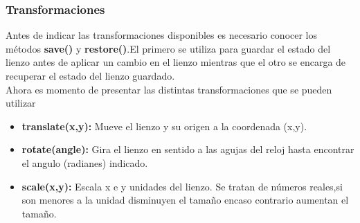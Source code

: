 \subsubsection*{Transformaciones}
Antes de indicar las transformaciones disponibles es necesario conocer los métodos \textbf{save()} y \textbf{restore()}.El primero se utiliza para guardar el estado del lienzo antes de aplicar un cambio en el lienzo mientras que el otro se encarga de recuperar el estado del lienzo guardado.
\\Ahora es momento de presentar las distintas transformaciones que se pueden utilizar
\begin{itemize}
\item \textbf{translate(x,y):} Mueve el lienzo y su origen a la coordenada (x,y).
\item\textbf{ rotate(angle):} Gira el lienzo en sentido a las agujas del reloj hasta encontrar el angulo (radianes) indicado.
\item \textbf{scale(x,y):} Escala x e y unidades del lienzo. Se tratan de números reales,si son menores a la unidad disminuyen el tamaño encaso contrario aumentan el tamaño.
\end{itemize}
